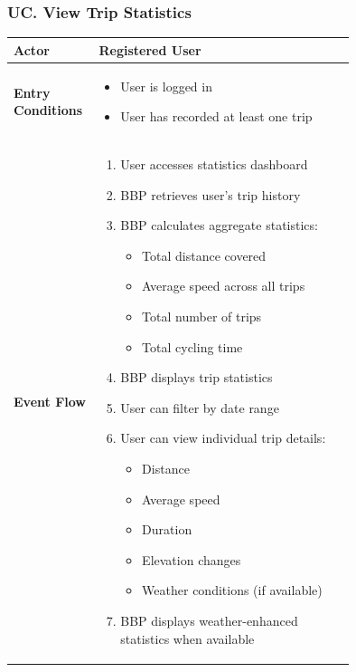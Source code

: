 \subsubsection*{UC\cuc . View Trip Statistics}
\begin{center}
    \begin{longtable}{|l|p{0.75\linewidth}|}
        \hline
        \textbf{Actor}            & Registered User \\
        \hline
        \textbf{Entry Conditions} & 
        \begin{itemize}
            \item User is logged in
            \item User has recorded at least one trip
        \end{itemize} \\
        \hline
        \textbf{Event Flow}       & 
        \begin{enumerate}
            \item User accesses statistics dashboard
            \item BBP retrieves user's trip history
            \item BBP calculates aggregate statistics:
            \begin{itemize}
                \item Total distance covered
                \item Average speed across all trips
                \item Total number of trips
                \item Total cycling time
            \end{itemize}
            \item BBP displays trip statistics
            \item User can filter by date range
            \item User can view individual trip details:
            \begin{itemize}
                \item Distance
                \item Average speed
                \item Duration
                \item Elevation changes
                \item Weather conditions (if available)
            \end{itemize}
            \item BBP displays weather-enhanced statistics when available

\end{enumerate}
\end{longtable}
\end{center}
